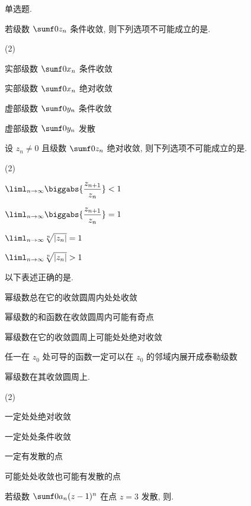 \begin{homework}
  \item 单选题.
  \begin{homework}
    \item 若级数 $\sumf0 z_n$ 条件收敛, 则下列选项不可能成立的是\fillbrace{}.
      \begin{exchoice}(2)
        \item 实部级数 $\sumf0 x_n$ 条件收敛
        \item 实部级数 $\sumf0 x_n$ 绝对收敛
        \item 虚部级数 $\sumf0 y_n$ 条件收敛
        \item 虚部级数 $\sumf0 y_n$ 发散
      \end{exchoice}
    \item 设 $z_n\neq0$ 且级数 $\sumf0 z_n$ 绝对收敛, 则下列选项不可能成立的是\fillbrace{}.
      \begin{exchoice}(2)
        \item $\liml_{n\ra\infty}\biggabs{\dfrac{z_{n+1}}{z_n}}<1$
        \item $\liml_{n\ra\infty}\biggabs{\dfrac{z_{n+1}}{z_n}}=1$
        \item $\liml_{n\ra\infty}\sqrt[n]{\abs{z_n}}=1$
        \item $\liml_{n\ra\infty}\sqrt[n]{\abs{z_n}}>1$
      \end{exchoice}
    \item 以下表述正确的是\fillbrace{}.
      \begin{exchoice}
        \item 幂级数总在它的收敛圆周内处处收敛
        \item 幂级数的和函数在收敛圆周内可能有奇点
        \item 幂级数在它的收敛圆周上可能处处绝对收敛
        \item 任一在 $z_0$ 处可导的函数一定可以在 $z_0$ 的邻域内展开成泰勒级数
      \end{exchoice}
    \item 幂级数在其收敛圆周上\fillbrace{}.
      \begin{exchoice}(2)
        \item 一定处处绝对收敛
        \item 一定处处条件收敛
        \item 一定有发散的点
        \item 可能处处收敛也可能有发散的点
      \end{exchoice}
    \item 若级数 $\sumf0 a_n(z-1)^n$ 在点 $z=3$ 发散, 则\fillbrace{}.

\end{homework}
\end{homework}
